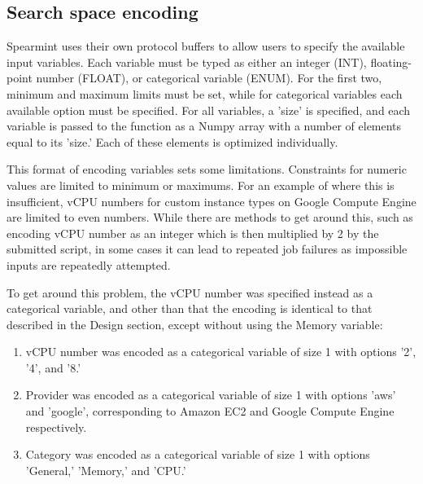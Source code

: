 \documentclass{report}
\begin{document}
\subsection{Search space encoding}
Spearmint uses their own protocol buffers to allow users to specify the available input variables. Each variable must be typed as either an integer (INT), floating-point number (FLOAT), or categorical variable (ENUM). For the first two, minimum and maximum limits must be set, while for categorical variables each available option must be specified. For all variables, a 'size' is specified, and each variable is passed to the function as a Numpy\cite{Klein2014} array with a number of elements equal to its 'size.' Each of these elements is optimized individually.

This format of encoding variables sets some limitations. Constraints for numeric values are limited to minimum or maximums. For an example of where this is insufficient, vCPU numbers for custom instance types on Google Compute Engine are limited to even numbers. While there are methods to get around this, such as encoding vCPU number as an integer which is then multiplied by 2 by the submitted script, in some cases it can lead to repeated job failures as impossible inputs are repeatedly attempted.

To get around this problem, the vCPU number was specified instead as a categorical variable, and other than that the encoding is identical to that described in the Design section, except without using the Memory variable:
\begin{enumerate}
\item vCPU number was encoded as a categorical variable of size 1 with options '2', '4', and '8.' 
\item Provider was encoded as a categorical variable of size 1 with options 'aws' and 'google', corresponding to Amazon EC2 and Google Compute Engine respectively.
\item Category was encoded as a categorical variable of size 1 with options 'General,' 'Memory,' and 'CPU.'
\end{enumerate}
\end{document}
